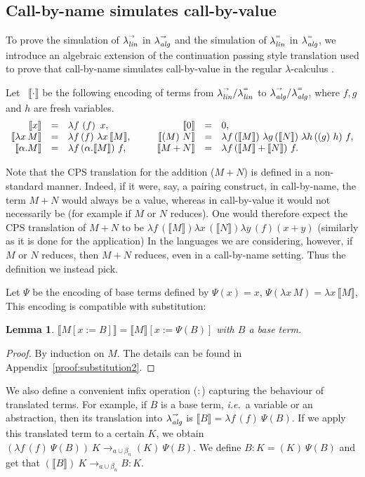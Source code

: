 \documentclass{LMCS}
\newtheorem{lemma}[theorem]{Lemma}
\newcommand{\App}[1]{The details can be found in Appendix~\ref{proof:#1}}
\newcommand{\xllin}[1]{\ensuremath{\lambda^{\raisebox{0.5ex}{\textrm{\tiny $#1$}}}_{{\it lin}}}}
\newcommand{\xlalg}[1]{\ensuremath{\lambda^{\raisebox{0.5ex}{\textrm{\tiny $#1$}}}_{{\it alg}}}}
\newcommand{\llinred}{\xllin{\rightarrow}}
\newcommand{\lalgred}{\xlalg{\rightarrow}}
\newcommand{\llineq}{\xllin{=}}
\newcommand{\lalgeq}{\xlalg{=}}
\newcommand{\xto}[1]{\ensuremath{\rightarrow_{#1}}}
\newcommand{\tobalgred}{\xto{a\cup\beta_n}}
\newcommand{\wt}[1]{\llbracket{#1}\rrbracket}
\newcommand{\cont}[1]{\lambda f\,\left(f\right)~#1}
\newcommand{\tapp}[5]{\lambda{#1}\,({#4})~\lambda{#2}\,({#5})~\lambda{#3}\,(({#2})~{#3})~{#1}}
\newcommand{\tappfgh}{\tapp{f}{g}{h}}
\begin{document}
\subsection{Call-by-name simulates call-by-value}\label{subsec:lintoalg}

To prove the simulation of $\llinred$ in $\lalgred$ and the
simulation of $\llineq$ in $\lalgeq$, we introduce an
algebraic extension of the continuation passing style translation used to
prove that call-by-name simulates call-by-value in the regular
$\lambda$-calculus \cite{PlotkinTCS75}.

Let ~$\wt{\cdot}$ be the following encoding of terms from $\llinred/\llineq$ to $\lalgred/\lalgeq$, where $f,g$ and $h$ are fresh variables.
\[
  \begin{array}{rcl@{\hspace{1cm}}rcl}
    \wt{x} &=& \cont x,&
    \wt{0} &=& 0,\\
    \wt{\lambda x\,M} & =&\lambda f\,(f)~\lambda x\,\wt M,&
    \wt{(M)~N} &=& \tappfgh{\wt M}{\wt N},\\
    \wt{\alpha.M} &=&\lambda f\,(\alpha.\wt M)~f,&
    \wt{M+N}&=&\lambda f\,(\wt M +\wt N)~f.
  \end{array}
\]

Note that the CPS translation for the addition ($M+N$) is defined in a
non-standard manner. Indeed, if it were, say, a pairing construct, in
call-by-name, the term $M+N$ would always be a value, whereas in
call-by-value it would not necessarily be (for example if $M$ or $N$
reduces). One would therefore expect the CPS translation of $M+N$ to be
$\lambda f\,(\wt{M})\lambda x\,(\wt{N})\lambda y\,(f)(x+y)$ (similarly
as it is done for the application)
In the languages we are considering, however, if $M$ or $N$ reduces,
then $M+N$ reduces, even in a call-by-name setting. Thus the
definition we instead pick.

Let $\Psi$ be the encoding of base terms defined by
$\Psi(x) = x$,
$\Psi(\lambda x\,M) =\lambda x\,\wt M$,
This encoding is compatible with substitution:
\begin{lemma}\label{lem:substitution2}
  $\wt{M[x:=B]}=\wt{M}[x:=\Psi(B)]$ with $B$ a base term.
\end{lemma}
\begin{proof}
  By induction on $M$. \App{substitution2}.
\end{proof}

We also define a convenient infix operation ($:$) capturing the
behaviour of translated terms. For example, if $B$ is a base term,
{\em i.e.}\ a variable or an abstraction, then its translation into
$\lalgred$ is $\wt{B}=\cont{\Psi(B)}$. If we apply this translated term
to a certain $K$, we obtain $(\cont{\Psi(B)})~K\tobalgred
(K)~\Psi(B)$. We define $B:K=(K)~\Psi(B)$ and get that
$(\wt{B})~K\tobalgred B:K$. 
\end{document}
